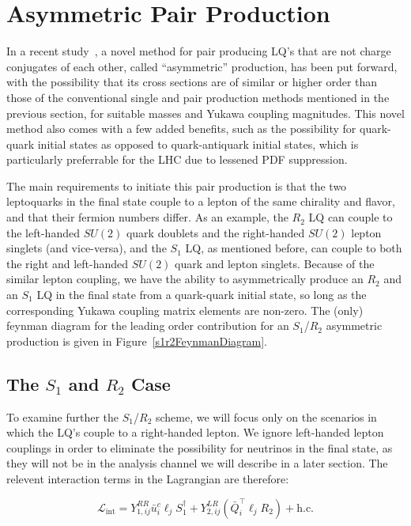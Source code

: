 \section{Asymmetric Pair Production}
    In a recent study~\cite{Dorsner_2023}, a novel method for pair producing LQ's that are not charge conjugates of each other, called ``asymmetric'' production, has been put forward, with the possibility that its cross sections are of similar or higher order than those of the conventional single and pair production methods mentioned in the previous section, for suitable masses and Yukawa coupling magnitudes. This novel method also comes with a few added benefits, such as the possibility for quark-quark initial states as opposed to quark-antiquark initial states, which is particularly preferrable for the LHC due to lessened PDF suppression.

    The main requirements to initiate this pair production is that the two leptoquarks in the final state couple to a lepton of the same chirality and flavor, and that their fermion numbers differ. As an example, the $R_2$ LQ can couple to the left-handed $SU(2)$ quark doublets and the right-handed $SU(2)$ lepton singlets (and vice-versa), and the $S_1$ LQ, as mentioned before, can couple to both the right and left-handed $SU(2)$ quark and lepton singlets. Because of the similar lepton coupling, we have the ability to asymmetrically produce an $R_2$ and an $S_1$ LQ in the final state from a quark-quark initial state, so long as the corresponding Yukawa coupling matrix elements are non-zero. The (only) feynman diagram for the leading order contribution for an $S_1$/$R_2$ asymmetric production is given in Figure~\ref{s1r2FeynmanDiagram}.

    

    \subsection{The \texorpdfstring{$S_1$ and $R_2$}{S1 and R2} Case}

        To examine further the $S_1$/$R_2$ scheme, we will focus only on the scenarios in which the LQ's couple to a right-handed lepton. We ignore left-handed lepton couplings in order to eliminate the possibility for neutrinos in the final state, as they will not be in the analysis channel we will describe in a later section. The relevent interaction terms in the Lagrangian are therefore:

        \begin{equation}
            \mathcal{L}_{\text{int}} = Y_{1,ij}^{RR} \bar{u}_i^c \ell_j S_1^{\dagger} + Y_{2,ij}^{LR} \left(\bar{Q}_i^{\intercal} \ell_j R_2\right) + \text{h.c.}
        \end{equation}

